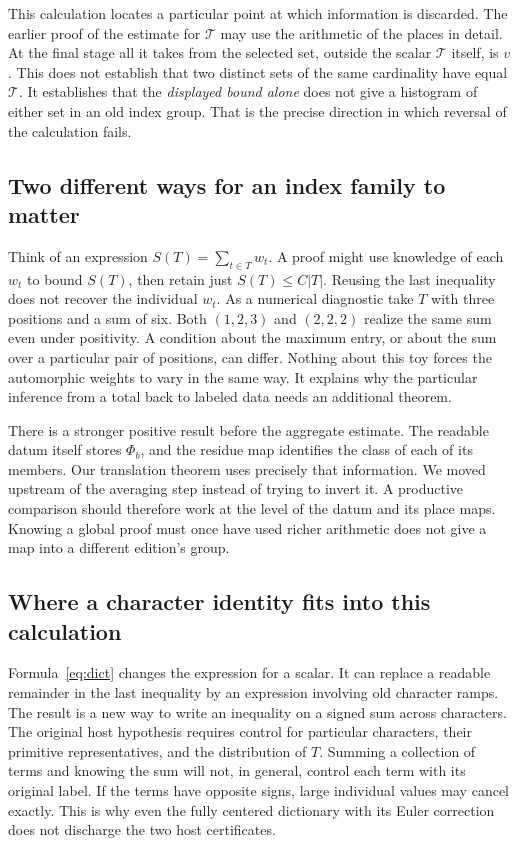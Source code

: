 \documentclass[12pt,letterpaper]{article}
\begin{document}
This calculation locates a particular point at which information is discarded. The earlier proof of the estimate for $\mathcal T$ may use the arithmetic of the places in detail. At the final stage all it takes from the selected set, outside the scalar $\mathcal T$ itself, is $v$. This does not establish that two distinct sets of the same cardinality have equal $\mathcal T$. It establishes that the \emph{displayed bound alone} does not give a histogram of either set in an old index group. That is the precise direction in which reversal of the calculation fails.

\subsection{Two different ways for an index family to matter}
Think of an expression $S(T)=\sum_{t\in T}w_t$. A proof might use knowledge of each $w_t$ to bound $S(T)$, then retain just $S(T)\le C|T|$. Reusing the last inequality does not recover the individual $w_t$. As a numerical diagnostic take $T$ with three positions and a sum of six. Both $(1,2,3)$ and $(2,2,2)$ realize the same sum even under positivity. A condition about the maximum entry, or about the sum over a particular pair of positions, can differ. Nothing about this toy forces the automorphic weights to vary in the same way. It explains why the particular inference from a total back to labeled data needs an additional theorem.

There is a stronger positive result before the aggregate estimate. The readable datum itself stores $\Phi_b$, and the residue map identifies the class of each of its members. Our translation theorem uses precisely that information. We moved upstream of the averaging step instead of trying to invert it. A productive comparison should therefore work at the level of the datum and its place maps. Knowing a global proof must once have used richer arithmetic does not give a map into a different edition's group.

\subsection{Where a character identity fits into this calculation}
Formula~\eqref{eq:dict} changes the expression for a scalar. It can replace a readable remainder in the last inequality by an expression involving old character ramps. The result is a new way to write an inequality on a signed sum across characters. The original host hypothesis requires control for particular characters, their primitive representatives, and the distribution of $T$. Summing a collection of terms and knowing the sum will not, in general, control each term with its original label. If the terms have opposite signs, large individual values may cancel exactly. This is why even the fully centered dictionary with its Euler correction does not discharge the two host certificates.
\end{document}
